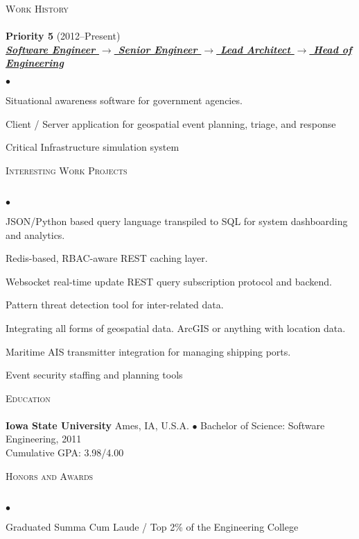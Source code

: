 \documentclass{article}
\newcommand{\lineunder} {
	\vspace*{-8pt} \\ \hspace*{-18pt} \hrulefill \\
}
\newcommand{\header}[1] {
	{\hspace*{-15pt}\vspace*{6pt} \textsc{#1}} \vspace*{-6pt} \lineunder
}
\newcommand{\employer}[3] {
	{ \textbf{#1} (#2)\\ \underline{\textbf{\emph{#3}}}\\  }
}
\newenvironment{achievements} {
	\begin{list}{$\bullet$}
		{\topsep 0pt \itemsep -2pt}
	}{
		\vspace*{4pt}\end{list}
	}
\newcommand{\school}[4] {
	\textbf{#1} #2 $\bullet$ #3\\
	\hspace*{15pt}#4 \\
	\vspace*{5pt}
}
\begin{document}
\header{Work History}

   \employer{Priority 5}{2012--Present}{Software Engineer \(\rightarrow\) Senior Engineer \(\rightarrow\) Lead Architect \(\rightarrow\) Head of Engineering}
		\begin{achievements}
         \item{Situational awareness software for government agencies.}
         \item{Client / Server application for geospatial event planning, triage, and response}
         \item{Critical Infrastructure simulation system}
		\end{achievements}

\header{Interesting Work Projects}

	\begin{achievements}
      \item{JSON/Python based query language transpiled to SQL for system dashboarding and analytics.}
      \item{Redis-based, RBAC-aware REST caching layer.}
      \item{Websocket real-time update REST query subscription protocol and backend.}
      \item{Pattern threat detection tool for inter-related data.}
      \item{Integrating all forms of geospatial data. ArcGIS or anything with location data.}
      \item{Maritime AIS transmitter integration for managing shipping ports.}
      \item{Event security staffing and planning tools}
   \end{achievements}

\header{Education}

	\school{Iowa State University}{Ames, IA, U.S.A.}{Bachelor of Science: Software Engineering, 2011}
	{Cumulative GPA: 3.98/4.00}

\header{Honors and Awards}

	\begin{achievements}
		\item{Graduated Summa Cum Laude / Top 2\% of the Engineering College}
	\end{achievements}
\end{document}
